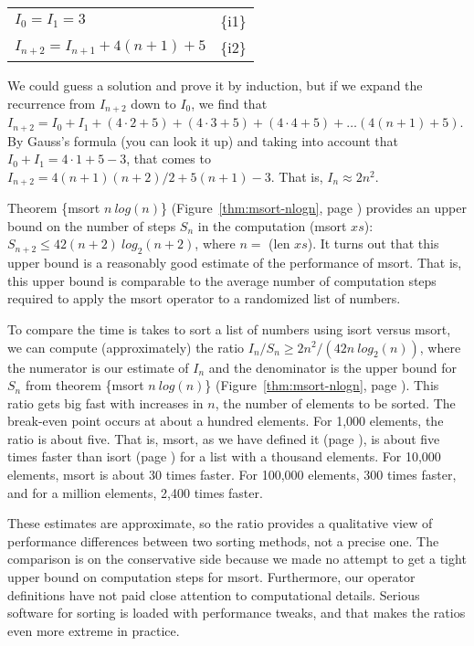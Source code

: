 \begin{center}
\begin{tabular}{ll}
$I_0 = I_1 = 3$              & \{i1\} \\
$I_{n+2} = I_{n+1} + 4(n+1) + 5$ & \{i2\} \\
\end{tabular}
\end{center}

We could guess a solution and prove it by induction,
but if we expand the recurrence from $I_{n+2}$ down to $I_0$,
we find that
$I_{n+2} = I_0 + I_1 + (4\cdot 2 + 5) + (4\cdot 3 + 5) + (4\cdot 4 + 5) + \dots (4(n+1) + 5)$.
By Gauss's formula (you can look it up) and taking into account that $I_0 + I_1 = 4\cdot 1+5-3$,
that comes to
$I_{n+2} = 4(n+1)(n+2)/2 + 5(n+1)- 3$.
That is, $I_n \approx 2n^2$.

Theorem \{msort $n~log(n)$\}
(Figure~\ref{thm:msort-nlogn}, page \pageref{thm:msort-nlogn}) provides
an upper bound on the number of steps $S_n$ in the computation (msort $xs$):
$S_{n+2} \leq 42(n+2)~log_2(n+2)$, where $n =$ (len $xs$).
It turns out that this upper bound is a reasonably good estimate
of the performance of msort.
That is, this upper bound is comparable to the average number
of computation steps required to apply the msort operator
to a randomized list of numbers.

To compare the time is takes to sort a list of numbers using isort versus msort,
we can compute (approximately) the ratio $I_n/S_n \geq 2n^2/(42n~log_2(n))$,
where the numerator is our estimate of $I_n$ and the denominator
is the upper bound for $S_n$ from
theorem \{msort $n~log(n)$\}
(Figure~\ref{thm:msort-nlogn}, page \pageref{thm:msort-nlogn}).
This ratio gets big fast with increases in $n$, the number of elements to be sorted.
The break-even point occurs at about a hundred elements.
For 1,000 elements, the ratio is about five.
That is, msort, as we have defined it (page \pageref{defun:msort-copy}),
is about five times faster
than isort (page \pageref{defun:insert-isort-copy})
for a list with a thousand elements.
For 10,000 elements, msort is about 30 times faster.
For 100,000 elements, 300 times faster,
and for a million elements, 2,400 times faster.

These estimates are approximate, so the ratio provides a qualitative
view of performance differences between two sorting methods, not a precise one.
The comparison is on the conservative side
because we made no attempt to get a tight
upper bound on computation steps for msort.
Furthermore, our operator definitions
have not paid close attention to computational details.
Serious software for sorting is loaded with performance tweaks,
and that makes the ratios even more extreme in practice.

